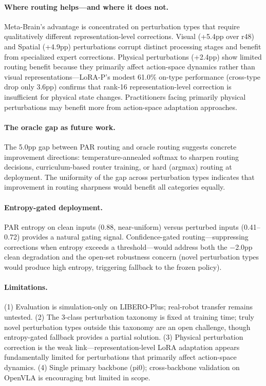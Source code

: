 \documentclass[10pt,twocolumn]{article}
\begin{document}
\paragraph{Where routing helps---and where it does not.}
Meta-Brain's advantage is concentrated on perturbation types that require qualitatively different representation-level corrections.
Visual (+5.4pp over r48) and Spatial (+4.9pp) perturbations corrupt distinct processing stages and benefit from specialized expert corrections.
Physical perturbations (+2.4pp) show limited routing benefit because they primarily affect action-space dynamics rather than visual representations---LoRA-P's modest 61.0\% on-type performance (cross-type drop only 3.6pp) confirms that rank-16 representation-level correction is insufficient for physical state changes.
Practitioners facing primarily physical perturbations may benefit more from action-space adaptation approaches.

\paragraph{The oracle gap as future work.}
The 5.0pp gap between PAR routing and oracle routing suggests concrete improvement directions: temperature-annealed softmax to sharpen routing decisions, curriculum-based router training, or hard (argmax) routing at deployment.
The uniformity of the gap across perturbation types indicates that improvement in routing sharpness would benefit all categories equally.

\paragraph{Entropy-gated deployment.}
PAR entropy on clean inputs (0.88, near-uniform) versus perturbed inputs (0.41--0.72) provides a natural gating signal.
Confidence-gated routing---suppressing corrections when entropy exceeds a threshold---would address both the $-$2.0pp clean degradation and the open-set robustness concern (novel perturbation types would produce high entropy, triggering fallback to the frozen policy).

\paragraph{Limitations.}
(1) Evaluation is simulation-only on LIBERO-Plus; real-robot transfer remains untested.
(2) The 3-class perturbation taxonomy is fixed at training time; truly novel perturbation types outside this taxonomy are an open challenge, though entropy-gated fallback provides a partial solution.
(3) Physical perturbation correction is the weak link---representation-level LoRA adaptation appears fundamentally limited for perturbations that primarily affect action-space dynamics.
(4) Single primary backbone (pi0); cross-backbone validation on OpenVLA is encouraging but limited in scope.
\end{document}
